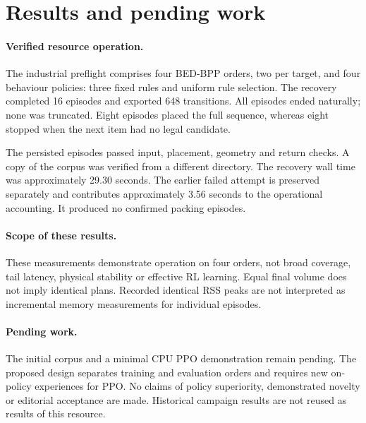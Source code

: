 \section{Results and pending work}

\paragraph{Verified resource operation.}
The industrial preflight comprises four BED-BPP orders, two per target,
and four behaviour policies: three fixed rules and uniform rule selection.
The recovery completed 16 episodes and exported 648 transitions.
All episodes ended naturally; none was truncated.
Eight episodes placed the full sequence, whereas eight stopped when
the next item had no legal candidate.

The persisted episodes passed input, placement, geometry and return
checks. A copy of the corpus was verified from a different directory.
The recovery wall time was approximately 29.30 seconds.
The earlier failed attempt is preserved separately and contributes
approximately 3.56 seconds to the operational accounting.
It produced no confirmed packing episodes.

\paragraph{Scope of these results.}
These measurements demonstrate operation on four orders, not broad
coverage, tail latency, physical stability or effective RL learning.
Equal final volume does not imply identical plans.
Recorded identical RSS peaks are not interpreted as incremental
memory measurements for individual episodes.

\paragraph{Pending work.}
The initial corpus and a minimal CPU PPO demonstration remain pending.
The proposed design separates training and evaluation orders and
requires new on-policy experiences for PPO.
No claims of policy superiority, demonstrated novelty or editorial
acceptance are made.
Historical campaign results are not reused as results of this resource.
